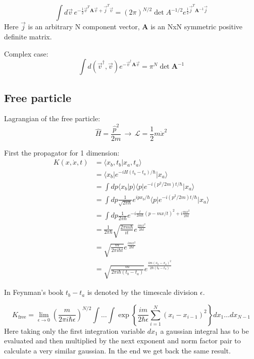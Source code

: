 \documentclass[12pt,a4paper]{article}
\newcommand{\ket}[1]{{ |#1 \rangle}}
\newcommand{\bra}[1]{{\langle#1|}}
\numberwithin{equation}{section}
\begin{document}
\begin{equation}
\int d\vec{v}\, e^{-\frac{1}{2}\vec{v}^T \textbf{A}\vec{v} +\vec{j}^T \vec{v}} = (2\pi)^{N/2} \det A^{-1/2} e^{\frac{1}{2} \vec{j}^T \textbf{A}^{-1}\vec{j}}
\end{equation}
Here $\vec{j}$ is an arbitrary N component vector, \textbf{A} is an NxN symmetric positive definite matrix.

Complex case:
\begin{equation}
\int d(\vec{v}^\dagger,\vec{v}) e^{-\vec{v}^\dagger \textbf{A}\vec{v}} = \pi^N \det \textbf{A}^{-1}
\end{equation}


\subsection{Free particle}

Lagrangian of the free particle:
\begin{equation}
\hat{H} = \frac{\hat{p}^2}{2m} \,\rightarrow\, \mathcal{L} = \frac{1}{2}m\dot{x}^2
\end{equation}

First the propagator for 1 dimension:
\begin{align}
K(x,\dot{x},t) &= \bra{x_b , t_b} x_a, t_a \rangle \\
&= \bra{x_b} e^{-iH(t_b-t_a)/\hbar} \ket{x_a} \\
&= \int dp \bra{x_b}p\rangle \bra{p}e^{-i (p^2/2m)t/\hbar} \ket{x_a} \\
&=\int dp \frac{1}{\sqrt{2\pi \hbar}} e^{i p x_b /\hbar} \bra{p}e^{-i (p^2/2m)t/\hbar} \ket{x_a} \\
&= \int dp \frac{1}{{2\pi \hbar}} e^{-i \frac{t}{2m\hbar} (p - mx/t)^2 + i \frac{mx^2}{2\hbar t}}\\
&= \frac{1}{{2\pi \hbar}} \sqrt{\frac{2 \pi m \hbar}{i t}} e^{\frac{i mx^2}{2 \hbar t}}\\
&= \sqrt{\frac{m}{2 \pi i \hbar t}}  e^{\frac{i m x^2}{2 \hbar t}}\\
&= \sqrt{\frac{m}{2 \pi i \hbar (t_b-t_a)}}  e^{\frac{i m (x_b-x_a)^2}{2 \hbar (t_b-t_a)}}
\end{align}

In Feynman's book $t_b - t_a$ is denoted by the timescale division $\epsilon$.

\begin{equation}
K_{\text{free}} = \lim_{\epsilon \rightarrow 0} \left( \frac{m}{2\pi i \hbar \epsilon}\right)^{N/2} \int \dots \int \exp\left\lbrace \frac{i m }{2\hbar \epsilon}\sum\limits_{i = 1}^N (x_i - x_{i-1})^2  \right\rbrace dx_1 \dots dx_{N-1}
\end{equation}
Here taking only the first integration variable $dx_1$ a gaussian integral has to be evaluated and then multiplied by the next exponent and norm factor pair to calculate a very similar gaussian. In the end we get back the same result.
\end{document}
